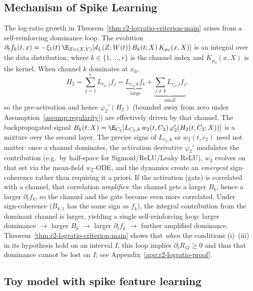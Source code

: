 \documentclass[nohyperref]{article}
\theoremstyle{plain}
\theoremstyle{definition}
\theoremstyle{remark}
\begin{document}
\subsection{Mechanism of Spike Learning}
\label{rem:dominance-mechanism}
The log-ratio growth in Theorem~\ref{thm:r2-logratio-criterion-main} arises from a self-reinforcing dominance loop. The evolution $\partial_t f_k(t,x)=-\xi_1(t)\,\E_{Z=(X,Y)}[d_L(Z;W(t))\,B_k(t;X)\,K_{\mu_0}(x,X)]$ is an integral over the data distribution, where $k\in\{1,\ldots,r\}$ is the channel index and $K_{\mu_0}(x,X)$ is the kernel. When channel $k$ dominates at $x_0$,
\[
H_2 = \sum_{j=1}^r L_{c_2,j}f_j = \underbrace{L_{c_2,k}f_k}_{\text{large}} + \underbrace{\sum_{j \neq k} L_{c_2,j}f_j}_{\text{small}},
\]
so the pre-activation and hence $\varphi_2'(H_2)$ (bounded away from zero under Assumption~\ref{assump:regularity}) are effectively driven by that channel. The backpropagated signal $B_k(t;X)=\E_{C_2}[L_{C_2,k}\,w_2(t,C_2)\,\varphi_2'(H_2(t,C_2;X))]$ is a mixture over the second layer. The precise signs of $L_{c_2,k}$ or $w_2(t,c_2)$ need not matter: once a channel dominates, the activation derivative $\varphi_2'$ modulates the contribution (e.g.\ by half-space for Sigmoid/ReLU/Leaky ReLU), $w_2$ evolves on that set via the mean-field $w_2$-ODE, and the dynamics create an \emph{emergent} sign-coherence rather than requiring it a priori. If the activation (gate) is correlated with a channel, that correlation \emph{amplifies}: the channel gets a larger $B_k$, hence a larger $\partial_t f_k$, so the channel and the gate become even more correlated. Under sign-coherence ($B_{k,1}$ has the same sign as $f_k$), the integral contribution from the dominant channel is larger, yielding a single self-reinforcing loop: larger dominance $\to$ larger $B_k$ $\to$ larger $\partial_t f_k$ $\to$ further amplified dominance. Theorem~\ref{thm:r2-logratio-criterion-main} shows that \emph{when} the conditions (i)--(iii) in its hypothesis hold on an interval $I$, this loop implies $\partial_t R_{12}\ge 0$ and thus that dominance cannot be lost on $I$; see Appendix~\ref{app:r2-logratio-proof}.





\subsection{Toy model with spike feature learning}
\label{sec:fourier-toy}
\end{document}
